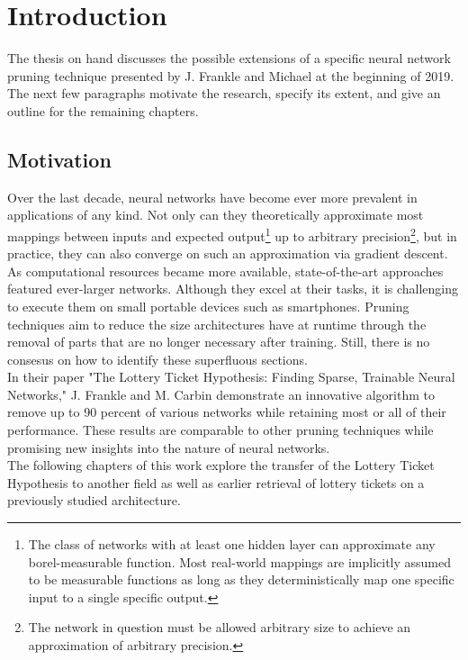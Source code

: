 \chapter{Introduction}
The thesis on hand discusses the possible extensions of a specific neural network pruning technique presented by J. Frankle and Michael at the beginning of 2019.\cite{LTH}\\
The next few paragraphs motivate the research,  specify its extent, and give an outline for the remaining chapters.

\section{Motivation}
Over the last decade, neural networks have become ever more prevalent in applications of any kind. Not only can they theoretically approximate most mappings between inputs and expected output\footnote{The class of networks with at least one hidden layer can approximate any borel-measurable function. Most real-world mappings are implicitly assumed to be measurable functions as long as they deterministically map one specific input to a single specific output.
} up to arbitrary precision\footnote{The network in question must be allowed arbitrary size to achieve an approximation of arbitrary precision.
}, but in practice, they can also converge on such an approximation via gradient descent. \cite{Approximator}\\ 
As computational resources became more available, state-of-the-art approaches featured ever-larger networks. Although they excel at their tasks, it is challenging to execute them on small portable devices such as smartphones. Pruning techniques aim to reduce the size architectures have at runtime through the removal of parts that are no longer necessary after training. Still, there is no consesus on how to identify these superfluous sections.\\
In their paper "The Lottery Ticket Hypothesis: Finding Sparse, Trainable Neural Networks," J. Frankle and M. Carbin demonstrate an innovative algorithm to remove up to 90 percent of various networks while retaining most or all of their performance. These results are comparable to other pruning techniques while promising new insights into the nature of neural networks.\cite{LTH}
\\
The following chapters of this work explore the transfer of the Lottery Ticket Hypothesis to another field as well as earlier retrieval of lottery tickets on a previously studied architecture.

